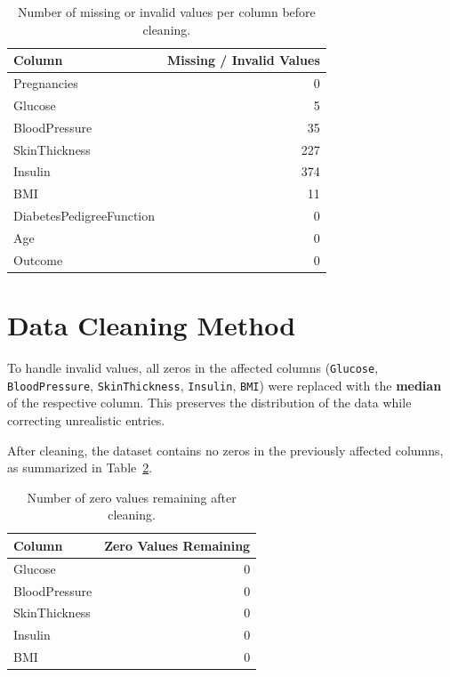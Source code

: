 \documentclass[12pt,a4paper]{article}
\begin{document}
\begin{table}[H]
\centering
\begin{tabular}{lr}
    \toprule
    \textbf{Column} & \textbf{Missing / Invalid Values} \\
    \midrule
    Pregnancies & 0 \\
    Glucose & 5 \\
    BloodPressure & 35 \\
    SkinThickness & 227 \\
    Insulin & 374 \\
    BMI & 11 \\
    DiabetesPedigreeFunction & 0 \\
    Age & 0 \\
    Outcome & 0 \\
    \bottomrule
    \end{tabular}
    
\caption{Number of missing or invalid values per column before cleaning.}
\label{tab:missing_values}
\end{table}

\section{Data Cleaning Method}
To handle invalid values, all zeros in the affected columns (\texttt{Glucose}, \texttt{BloodPressure}, \texttt{SkinThickness}, \texttt{Insulin}, \texttt{BMI}) were replaced with the \textbf{median} of the respective column. This preserves the distribution of the data while correcting unrealistic entries.

After cleaning, the dataset contains no zeros in the previously affected columns, as summarized in Table~\ref{tab:after_cleaning}.

\begin{table}[H]
\centering
\begin{tabular}{lr}
\toprule
\textbf{Column} & \textbf{Zero Values Remaining} \\
\midrule
Glucose & 0 \\
BloodPressure & 0 \\
SkinThickness & 0 \\
Insulin & 0 \\
BMI & 0 \\
\bottomrule
\end{tabular}
\caption{Number of zero values remaining after cleaning.}
\label{tab:after_cleaning}
\end{table}
\end{document}
